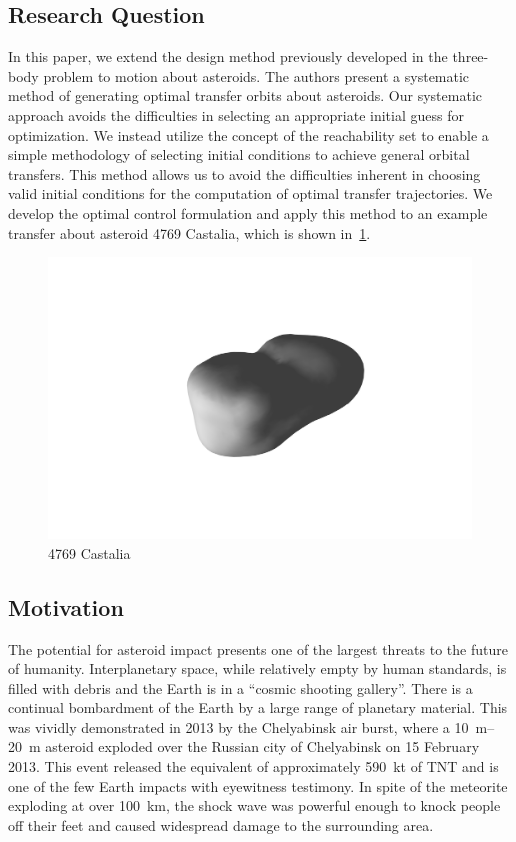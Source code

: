 \documentclass[11pt,reqno]{amsart} %
\begin{document}
\begin{multicols}{2}
\subsection{Research Question}
In this paper, we extend the design method previously developed in the three-body problem to motion about asteroids.
The authors present a systematic method of generating optimal transfer orbits about asteroids.
Our systematic approach avoids the difficulties in selecting an appropriate initial guess for optimization.
We instead utilize the concept of the reachability set to enable a simple methodology of selecting initial conditions to achieve general orbital transfers.
This method allows us to avoid the difficulties inherent in choosing valid initial conditions for the computation of optimal transfer trajectories.
We develop the optimal control formulation and apply this method to an example transfer about asteroid 4769 Castalia, which is shown in~\cref{fig:castalia}.
\begin{figure}[H]
    \centering
    \includegraphics[width=0.5\columnwidth]{figures/castalia.pdf}
    \caption{4769 Castalia}\label{fig:castalia}
\end{figure}
\subsection{Motivation}

The potential for asteroid impact presents one of the largest threats to the future of humanity.
Interplanetary space, while relatively empty by human standards, is filled with debris and the Earth is in a ``cosmic shooting gallery''.
There is a continual bombardment of the Earth by a large range of planetary material.
This was vividly demonstrated in 2013 by the Chelyabinsk air burst, where a \SIrange{10}{20}{\meter} asteroid exploded over the Russian city of Chelyabinsk on  15 February 2013.
This event released the equivalent of approximately \SI{590}{\kilo\tonne} of TNT and is one of the few Earth impacts with eyewitness testimony.
In spite of the meteorite exploding at over \SI{100}{\kilo\meter}, the shock wave was powerful enough to knock people off their feet and caused widespread damage to the surrounding area.


\end{multicols}
\end{document}
